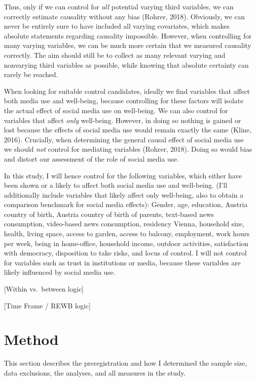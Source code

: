 \documentclass[
  english,
  man,floatsintext]{apa6}
\begin{document}
Thus, only if we can control for \emph{all} potential varying third variables, we can correctly estimate causality without any bias (Rohrer, 2018).
Obviously, we can never be entirely sure to have included all varying covariates, which makes absolute statements regarding causality impossible.
However, when controlling for many varying variables, we can be much more certain that we measured causality correctly.
The aim should still be to collect as many relevant varying and nonvarying third variables as possible, while knowing that absolute certainty can rarely be reached.

When looking for suitable control candidates, ideally we find variables that affect both media use and well-being, because controlling for these factors will isolate the actual effect of social media use on well-being.
We can also control for variables that affect \emph{only} well-being.
However, in doing so nothing is gained or lost because the effects of social media use would remain exactly the same (Kline, 2016).
Crucially, when determining the general causal effect of social media use we should \emph{not} control for mediating variables (Rohrer, 2018).
Doing so would bias and distort our assessment of the role of social media use.

In this study, I will hence control for the following variables, which either have been shown or a likely to affect both social media use and well-being.
(I'll additionally include variables that likely affect only well-being, also to obtain a comparison benchmark for social media effects):
Gender, age, education, Austria country of birth, Austria country of birth of parents, text-based news consumption, video-based news consumption, residency Vienna, household size, health, living space, access to garden, access to balcony, employment, work hours per week, being in home-office, household income, outdoor activities, satisfaction with democracy, disposition to take risks, and locus of control.
I will not control for variables such as trust in institutions or media, because these variables are likely influenced by social media use.

{[}Within vs.~between logic{]}

{[}Time Frame / REWB logic{]}

\hypertarget{method}{%
\section{Method}\label{method}}

This section describes the preregistration and how I determined the sample size, data exclusions, the analyses, and all measures in the study.
\end{document}

